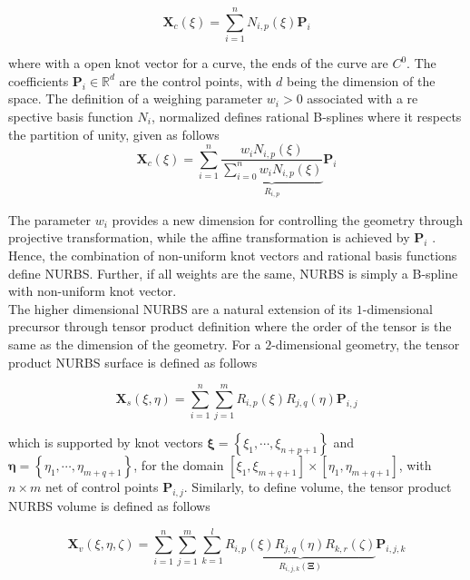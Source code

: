 \begin{equation}
\bm X_c(\xi) =  \sum_{i=1}^n N_{i,p}(\xi)  \bm {{P}}_i
\end{equation}

where with a open knot vector for a curve, the ends of the curve are $C^0$. The coefficients $\bm{{P}}_i \in \mathbb{R}^{d}$ are the control points, with $d$ being the dimension of the space. The definition of a weighing parameter $w_i >0$ associated with a re spective basis function $N_i$, normalized defines rational B-splines where it respects the partition of unity, given as follows
\begin{equation}
\bm X_c(\xi) =  \sum_{i=1}^n\underbrace{\frac{w_iN_{i,p}(\xi)}{\sum_{i=0}^n{w_iN_{i,p}(\xi)}}}_{R_{i,p}}\bm {{P}}_i \label{NURBS_c}
\end{equation}

The parameter $w_i$ provides a new dimension for controlling the geometry through projective transformation, while the affine transformation is achieved by $\bm{{P}}_i$ . Hence, the combination of non-uniform knot vectors and rational basis functions define NURBS. Further, if all weights are the same, NURBS is simply a B-spline with non-uniform knot vector.\\


The higher dimensional NURBS are a natural extension of its $1$-dimensional precursor through tensor product definition where the order of the tensor is the same as the dimension of the geometry. For a $2$-dimensional geometry, the tensor product NURBS surface is defined as follows

\begin{equation}
\bm X_s(\xi,\eta) =   \sum_{i=1}^n\sum_{j=1}^m  R_{i,p}(\xi)R_{j,q}(\eta)\bm{{P}}_{i,j} \label{NURBS_s}
\end{equation}

which is supported by knot vectors $\bm \xi = \left\{ {{\xi _1}, \cdots ,{\xi _{n + p + 1}}} \right\}$ and $\bm \eta = \left\{ {{\eta _1}, \cdots ,{\eta _{m + q + 1}}} \right\}$, for the domain $[\xi_1,\xi_{m+q+1}] \times [\eta_1,\eta_{m+q+1}]$, with $n\times m$ net of control points $\bm{{P}}_{i,j}$. Similarly, to define volume, the tensor product NURBS volume is defined as follows

\begin{equation} \label{NURBS_v}
\bm X_v(\xi,\eta,\zeta) =   \sum_{i=1}^n\sum_{j=1}^m\sum_{k=1}^l  \underbrace{R_{i,p}(\xi)R_{j,q}(\eta)R_{k,r}(\zeta)}_{R_{i,j,k}(\mathbf{\Xi})}\bm {{P}}_{i,j,k}
\end{equation}

